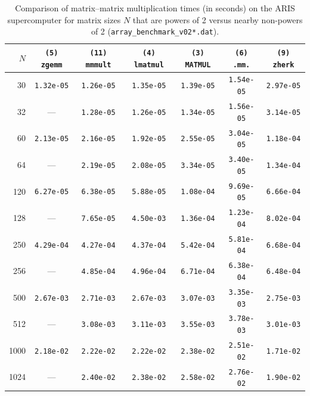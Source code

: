 \begin{table}[htbp]
\centering
\begin{tabular}{r c c c c c c}
\toprule
$N$ & \texttt{(5) zgemm} & \texttt{(11) mmmult} & \texttt{(4) lmatmul} & \texttt{(3) MATMUL} & \texttt{(6) .mm.} & \texttt{(9) zherk} \\
\midrule
30   & \texttt{1.32e-05} & \texttt{1.26e-05} & \texttt{1.35e-05} & \texttt{1.39e-05} & \texttt{1.54e-05} & \texttt{2.97e-05} \\
32   & ---               & \texttt{1.28e-05} & \texttt{1.26e-05} & \texttt{1.34e-05} & \texttt{1.56e-05} & \texttt{3.14e-05} \\
60   & \texttt{2.13e-05} & \texttt{2.16e-05} & \texttt{1.92e-05} & \texttt{2.55e-05} & \texttt{3.04e-05} & \texttt{1.18e-04} \\
64   & ---               & \texttt{2.19e-05} & \texttt{2.08e-05} & \texttt{3.34e-05} & \texttt{3.40e-05} & \texttt{1.34e-04} \\
120  & \texttt{6.27e-05} & \texttt{6.38e-05} & \texttt{5.88e-05} & \texttt{1.08e-04} & \texttt{9.69e-05} & \texttt{6.66e-04} \\
128  & ---               & \texttt{7.65e-05} & \texttt{4.50e-03} & \texttt{1.36e-04} & \texttt{1.23e-04} & \texttt{8.02e-04} \\
250  & \texttt{4.29e-04} & \texttt{4.27e-04} & \texttt{4.37e-04} & \texttt{5.42e-04} & \texttt{5.81e-04} & \texttt{6.68e-04} \\
256  & ---               & \texttt{4.85e-04} & \texttt{4.96e-04} & \texttt{6.71e-04} & \texttt{6.38e-04} & \texttt{6.48e-04} \\
500  & \texttt{2.67e-03} & \texttt{2.71e-03} & \texttt{2.67e-03} & \texttt{3.07e-03} & \texttt{3.35e-03} & \texttt{2.75e-03} \\
512  & ---               & \texttt{3.08e-03} & \texttt{3.11e-03} & \texttt{3.55e-03} & \texttt{3.78e-03} & \texttt{3.01e-03} \\
1000 & \texttt{2.18e-02} & \texttt{2.22e-02} & \texttt{2.22e-02} & \texttt{2.38e-02} & \texttt{2.51e-02} & \texttt{1.71e-02} \\
1024 & ---               & \texttt{2.40e-02} & \texttt{2.38e-02} & \texttt{2.58e-02} & \texttt{2.76e-02} & \texttt{1.90e-02} \\
\bottomrule
\end{tabular}
\caption{\label{tab:b4}Comparison of matrix--matrix multiplication times (in seconds) on the ARIS supercomputer for matrix sizes $N$ that are powers of 2 versus nearby non-powers of 2 (\texttt{array\_benchmark\_v02*.dat}).}
\end{table}

